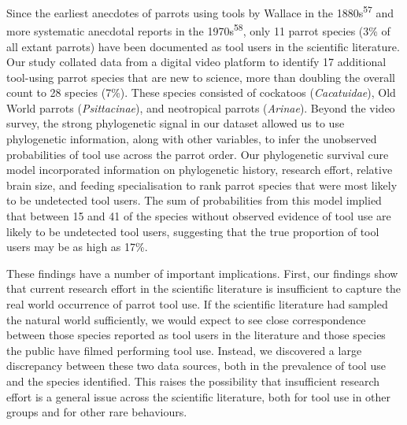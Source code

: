 \documentclass[
  man, donotrepeattitle,floatsintext]{apa6}
\begin{document}
Since the earliest anecdotes of parrots using tools by Wallace in the 1880s\textsuperscript{57} and more systematic anecdotal reports in the 1970s\textsuperscript{58},
only 11 parrot species (3\% of all extant parrots) have been documented as tool
users in the scientific literature. Our study collated data from a digital video
platform to identify 17 additional tool-using parrot species that are new to
science, more than doubling the overall count to 28 species (7\%). These species
consisted of cockatoos (\emph{Cacatuidae}), Old World parrots (\emph{Psittacinae}), and
neotropical parrots (\emph{Arinae}). Beyond the video survey, the strong
phylogenetic signal in our dataset allowed us to use phylogenetic information,
along with other variables, to infer the unobserved probabilities of tool use
across the parrot order. Our phylogenetic survival cure model incorporated
information on phylogenetic history, research effort, relative brain size, and
feeding specialisation to rank parrot species that were most likely to be
undetected tool users. The sum of probabilities from this model implied that
between 15 and 41 of the species without observed evidence of tool use are
likely to be undetected tool users, suggesting that the true proportion of tool
users may be as high as 17\%.

These findings have a number of important implications. First, our findings show
that current research effort in the scientific literature is insufficient to
capture the real world occurrence of parrot tool use. If the scientific
literature had sampled the natural world sufficiently, we would expect to see
close correspondence between those species reported as tool users in the
literature and those species the public have filmed performing tool use.
Instead, we discovered a large discrepancy between these two data sources, both
in the prevalence of tool use and the species identified. This raises the
possibility that insufficient research effort is a general issue across the
scientific literature, both for tool use in other groups and for other rare
behaviours.
\end{document}
